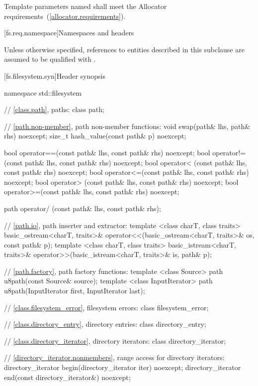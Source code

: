 \pnum
Template parameters named  shall meet the
Allocator requirements~(\ref{allocator.requirements}).

[fs.req.namespace]{Namespaces and headers}

\pnum
Unless otherwise specified, references to entities described in this
subclause are assumed to be qualified with .

[fs.filesystem.syn]{Header  synopsis}
%

\begin{codeblock}
namespace std::filesystem {
  // \ref{class.path}, paths:
  class path;

  // \ref{path.non-member}, path non-member functions:
  void swap(path& lhs, path& rhs) noexcept;
  size_t hash_value(const path& p) noexcept;

  bool operator==(const path& lhs, const path& rhs) noexcept;
  bool operator!=(const path& lhs, const path& rhs) noexcept;
  bool operator< (const path& lhs, const path& rhs) noexcept;
  bool operator<=(const path& lhs, const path& rhs) noexcept;
  bool operator> (const path& lhs, const path& rhs) noexcept;
  bool operator>=(const path& lhs, const path& rhs) noexcept;

  path operator/ (const path& lhs, const path& rhs);

  // \ref{path.io}, path inserter and extractor:
  template <class charT, class traits>
    basic_ostream<charT, traits>&
      operator<<(basic_ostream<charT, traits>& os, const path& p);
  template <class charT, class traits>
    basic_istream<charT, traits>&
      operator>>(basic_istream<charT, traits>& is, path& p);

  // \ref{path.factory}, path factory functions:
  template <class Source>
    path u8path(const Source& source);
  template <class InputIterator>
    path u8path(InputIterator first, InputIterator last);

  // \ref{class.filesystem_error}, filesystem errors:
  class filesystem_error;

  // \ref{class.directory_entry}, directory entries:
  class directory_entry;

  // \ref{class.directory_iterator}, directory iterators:
  class directory_iterator;

  // \ref{directory_iterator.nonmembers}, range access for directory iterators:
  directory_iterator begin(directory_iterator iter) noexcept;
  directory_iterator end(const directory_iterator&) noexcept;

}
\end{codeblock}
